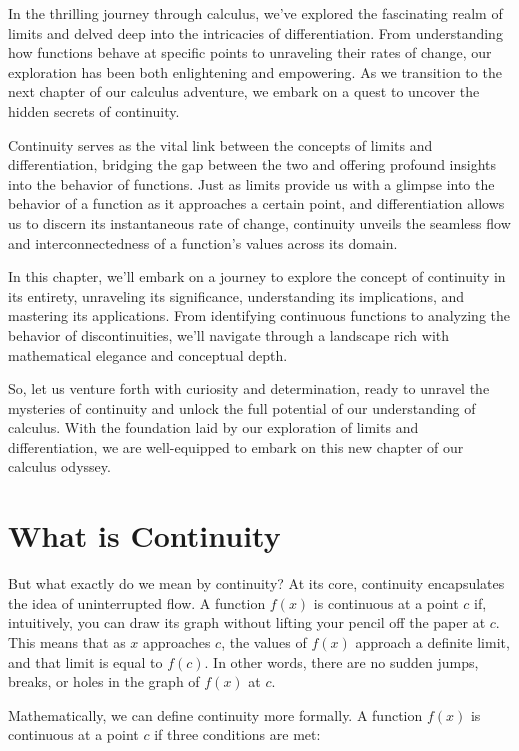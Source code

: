 In the thrilling journey through calculus, we've explored the fascinating realm of limits and delved deep into the intricacies of differentiation. From understanding how functions behave at specific points to unraveling their rates of change, our exploration has been both enlightening and empowering. As we transition to the next chapter of our calculus adventure, we embark on a quest to uncover the hidden secrets of continuity.

Continuity serves as the vital link between the concepts of limits and differentiation, bridging the gap between the two and offering profound insights into the behavior of functions. Just as limits provide us with a glimpse into the behavior of a function as it approaches a certain point, and differentiation allows us to discern its instantaneous rate of change, continuity unveils the seamless flow and interconnectedness of a function's values across its domain.

In this chapter, we'll embark on a journey to explore the concept of continuity in its entirety, unraveling its significance, understanding its implications, and mastering its applications. From identifying continuous functions to analyzing the behavior of discontinuities, we'll navigate through a landscape rich with mathematical elegance and conceptual depth.

So, let us venture forth with curiosity and determination, ready to unravel the mysteries of continuity and unlock the full potential of our understanding of calculus. With the foundation laid by our exploration of limits and differentiation, we are well-equipped to embark on this new chapter of our calculus odyssey.


\section{What is Continuity}

But what exactly do we mean by continuity? At its core, continuity encapsulates the idea of uninterrupted flow. A function \( f(x) \) is continuous at a point \( c \) if, intuitively, you can draw its graph without lifting your pencil off the paper at \( c \). This means that as \( x \) approaches \( c \), the values of \( f(x) \) approach a definite limit, and that limit is equal to \( f(c) \). In other words, there are no sudden jumps, breaks, or holes in the graph of \( f(x) \) at \( c \).

Mathematically, we can define continuity more formally. A function \( f(x) \) is continuous at a point \( c \) if three conditions are met:

